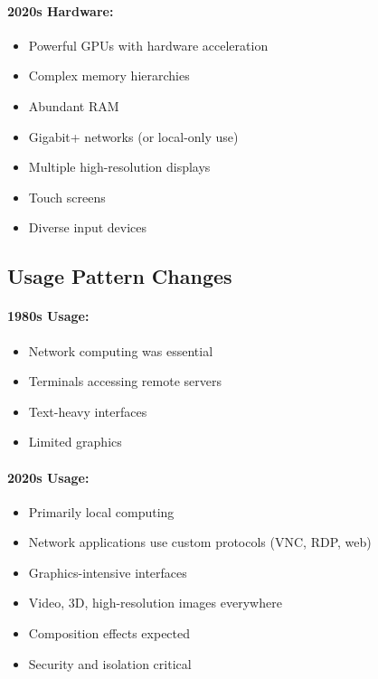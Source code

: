 \paragraph{2020s Hardware:}
\begin{itemize}[leftmargin=*]
    \item Powerful GPUs with hardware acceleration
    \item Complex memory hierarchies
    \item Abundant RAM
    \item Gigabit+ networks (or local-only use)
    \item Multiple high-resolution displays
    \item Touch screens
    \item Diverse input devices
\end{itemize}

\subsection{Usage Pattern Changes}

\paragraph{1980s Usage:}
\begin{itemize}[leftmargin=*]
    \item Network computing was essential
    \item Terminals accessing remote servers
    \item Text-heavy interfaces
    \item Limited graphics
\end{itemize}

\paragraph{2020s Usage:}
\begin{itemize}[leftmargin=*]
    \item Primarily local computing
    \item Network applications use custom protocols (VNC, RDP, web)
    \item Graphics-intensive interfaces
    \item Video, 3D, high-resolution images everywhere
    \item Composition effects expected
    \item Security and isolation critical
\end{itemize}

